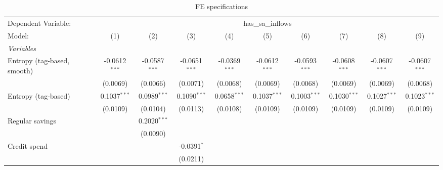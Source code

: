 
\begin{table}[htbp]
   \centering
   \caption{\label{tab:reg_entropy_savings_obo} FE specifications}
   \begin{footnotesize}
      \begin{tabular}{lccccccccc}
         \tabularnewline\midrule\midrule
         Dependent Variable: & \multicolumn{9}{c}{has\_sa\_inflows}\\
         Model:                      & (1)             & (2)             & (3)             & (4)             & (5)             & (6)             & (7)             & (8)             & (9)\\
         \midrule \emph{Variables} &   &   &   &   &   &   &   &   &  \\
         Entropy (tag-based, smooth) & -0.0612$^{***}$ & -0.0587$^{***}$ & -0.0651$^{***}$ & -0.0369$^{***}$ & -0.0612$^{***}$ & -0.0593$^{***}$ & -0.0608$^{***}$ & -0.0607$^{***}$ & -0.0607$^{***}$\\
                                     & (0.0069)        & (0.0066)        & (0.0071)        & (0.0068)        & (0.0069)        & (0.0068)        & (0.0069)        & (0.0069)        & (0.0068)\\
         Entropy (tag-based)         & 0.1037$^{***}$  & 0.0989$^{***}$  & 0.1090$^{***}$  & 0.0658$^{***}$  & 0.1037$^{***}$  & 0.1003$^{***}$  & 0.1030$^{***}$  & 0.1027$^{***}$  & 0.1023$^{***}$\\
                                     & (0.0109)        & (0.0104)        & (0.0113)        & (0.0108)        & (0.0109)        & (0.0109)        & (0.0109)        & (0.0109)        & (0.0109)\\
         Regular savings             &                 & 0.2020$^{***}$  &                 &                 &                 &                 &                 &                 &   \\
                                     &                 & (0.0090)        &                 &                 &                 &                 &                 &                 &   \\
         Credit spend                &                 &                 & -0.0391$^{*}$   &                 &                 &                 &                 &                 &   \\
                                     &                 &                 & (0.0211)        &                 &                 &                 &                 &                 &   \\

\end{tabular}
\end{footnotesize}
\end{table}
